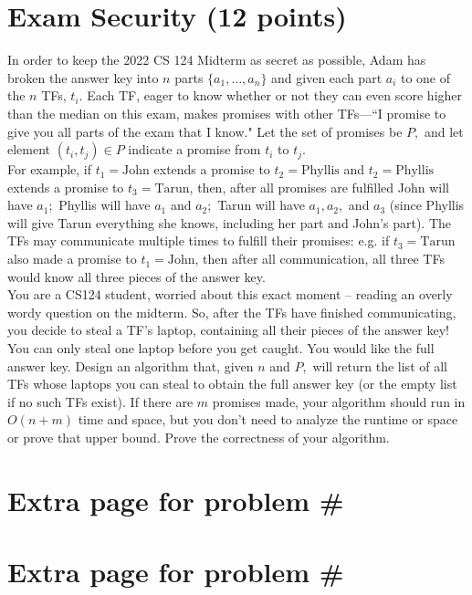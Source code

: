 \documentclass[11pt]{article}
\begin{document}
\newpage
\section{Exam Security (12 points)}
In order to keep the 2022 CS 124 Midterm as secret as possible, Adam has broken the answer key into $n$ parts $\{a_1, \ldots, a_n\}$ and given each part $a_i$ to one of the $n$ TFs, $t_i$. Each TF, eager to know whether or not they can even score higher than the median on this exam, makes promises with other TFs---``I promise to give you all parts of the exam that I know." Let the set of promises be $P,$ and let element $(t_i, t_j) \in P$ indicate a promise from $t_i$ to $t_j.$\\

For example, if $t_1 = \text{John}$ extends a promise to $t_2 = \text{Phyllis}$ and $t_2 = \text{Phyllis}$ extends a promise to $t_3 = \text{Tarun}$, then, after all promises are fulfilled John will have $a_1;$ Phyllis will have $a_1$ and $a_2;$ Tarun will have $a_1, a_2,$ and $a_3$ (since Phyllis will give Tarun everything she knows, including her part and John's part). The TFs may communicate multiple times to fulfill their promises: e.g. if $t_3 = \text{Tarun}$ also made a promise to $t_1 = \text{John}$, then after all communication, all three TFs would know all three pieces of the answer key.\\

You are a CS124 student, worried about this exact moment -- reading an overly wordy question on the midterm. So, after the TFs have finished communicating, you decide to steal a TF's laptop, containing all their pieces of the answer key! You can only steal one laptop before you get caught. You would like the full answer key. Design an algorithm that, given $n$ and $P,$ will return the list of all TFs whose laptops you can steal to obtain the full answer key (or the empty list if no such TFs exist). If there are $m$ promises made, your algorithm should run in $O(n+m)$ time and space, but you don't need to analyze the runtime or space or prove that upper bound. Prove the correctness of your algorithm.

\newpage

\section*{Extra page for problem \# \underline{\hspace{1cm}}}
\newpage

\section*{Extra page for problem \# \underline{\hspace{1cm}}}
\end{document}
